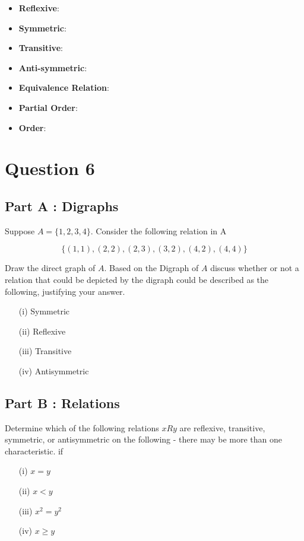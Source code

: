 \documentclass[]{report}
\begin{document}
\begin{itemize}
	\item \textbf{Reflexive}: 
	\item \textbf{Symmetric}: 
	\item \textbf{Transitive}: 
	\item \textbf{Anti-symmetric}: 
	\item \textbf{Equivalence Relation}: 
	\item \textbf{Partial Order}:
	\item \textbf{Order}:
\end{itemize}

\section*{Question 6}

\subsection*{Part A : Digraphs}

Suppose $A = \{1,2,3,4\}$. Consider the following relation in A

\[ \{  (1,1),(2,2),(2,3),(3,2),(4,2),(4,4)\} \]

Draw the direct graph of $A$. Based on the Digraph of $A$ discuss whether or not a relation that could be depicted by the digraph could be described as the following, justifying your answer.


\begin{itemize}
	\item[(i)] Symmetric
	\item[(ii)] Reflexive 
	\item[(iii)] Transitive
	\item[(iv)] Antisymmetric
\end{itemize}
\subsection*{Part B : Relations}
Determine which of the following relations $ x R y$ are reflexive, transitive, symmetric, or antisymmetric on the following - there may be more than one characteristic.  if

\begin{itemize} 
	\item[(i)] $x = y$
	\item[(ii)] $x < y$
	\item[(iii)] $x^2 = y^2$
	\item[(iv)] $x \geq y$
\end{itemize}
\end{document}
